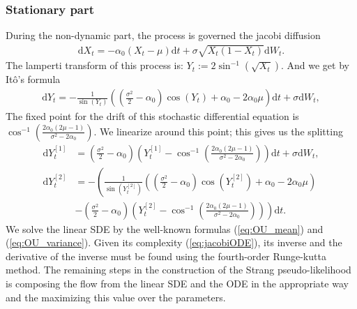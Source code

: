 \subsubsection{Stationary part}
During the non-dynamic part, the process is governed the jacobi diffusion
\begin{align}
    \mathrm{d}X_t = -\alpha_0\left(X_t - \mu\right)\mathrm{d}t + \sigma \sqrt{X_t\left(1 - X_t\right)}\mathrm{d}W_t.
\end{align}
The lamperti transform of this process is: $Y_t := 2 \sin^{-1}\left(\sqrt{X_t}\right)$. And we get by Itô's formula 
\begin{align}
    \mathrm{d}Y_t = -\frac{1}{\sin\left(Y_t\right)}\left(\left(\frac{\sigma^2}{2}-\alpha_0\right)\cos(Y_t) + \alpha_0 - 2\alpha_0\mu\right)\mathrm{d}t + \sigma \mathrm{d}W_t,
\end{align}
The fixed point for the drift of this stochastic differential equation is $\cos^{-1}\left(\frac{2\alpha_0\left(2\mu - 1\right)}{\sigma^2 - 2\alpha_0}\right)$. We linearize around this point; this gives us the splitting
\begin{align}
    \mathrm{d}Y_t^{[1]} &= \left(\frac{\sigma^2}{2} - \alpha_0\right)\left(Y_t^{[1]} - \cos^{-1}\left(\frac{2\alpha_0\left(2\mu - 1\right)}{\sigma^2 - 2\alpha_0}\right)\right)\mathrm{d}t + \sigma \mathrm{d}W_t,\\
    \mathrm{d}Y_t^{[2]} &= -\left(\frac{1}{\sin\left(Y_t^{[2]}\right)}\left(\left(\frac{\sigma^2}{2}-\alpha_0\right)\cos(Y_t^{[2]}) + \alpha_0 - 2\alpha_0\mu\right) \right. \nonumber \\
    &- \left. \left(\frac{\sigma^2}{2} - \alpha_0\right)\left(Y_t^{[2]} - \cos^{-1}\left(\frac{2\alpha_0\left(2\mu - 1\right)}{\sigma^2 - 2\alpha_0}\right)\right) \right)\mathrm{d}t. \label{eq:jacobiODE}
\end{align}
We solve the linear SDE by the well-known formulas (\ref{eq:OU_mean}) and (\ref{eq:OU_variance}). Given its complexity (\ref{eq:jacobiODE}), its inverse and the derivative of the inverse must be found using the fourth-order Runge-kutta method. The remaining steps in the construction of the Strang pseudo-likelihood is composing the flow from the linear SDE and the ODE in the appropriate way and the maximizing this value over the parameters.
